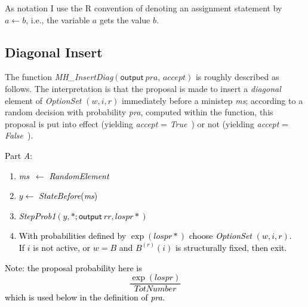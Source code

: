 \documentclass[a4paper,12pt,fleqn]{article}
\newcommand{\nnm}[1]{\textsf{\small\textit{#1}\ }}
\newcommand{\R}{{\sf R }}
\newcommand{\ms}{\textsl{\textsf{\small ms}}} %
\newcommand{\adda}[1]{{#1}}  %
\newcommand{\addaa}[1]{{\textcolor[named]{Black}{#1}}}  %
\begin{document}
As notation I use the \R convention of denoting an assignment statement by $a \leftarrow b$,
i.e., the variable $a$ gets the value $b$.

\subsection{Diagonal Insert}


The function
\textit{MH\_InsertDiag}$(%
\textsf{output}\ \textit{pra, accept})$
is roughly described as follows.
The interpretation is that
the proposal is made to insert a \textit{diagonal} element of \adda{\textit{OptionSet}}
$(w,i,r)$ immediately before a ministep \ms;
according to a random decision with probability \textit{pra},
computed within the function,
this proposal is put into effect (yielding \textit{accept} = \nnm{True})
or not (yielding \textit{accept} = \nnm{False}).

\newpage
\addaa{
Part \emph{A}:
\begin{enumerate}
\item \ms\ $ \leftarrow $ \textit{RandomElement}
\item $y \leftarrow $ \textit{StateBefore}(\ms)
\item \textit{StepProb1}$(y, *; \textsf{output}\ rr, lospr*)$
\item With probabilities defined by $\exp(lospr*)$ choose \textit{OptionSet} $(w,i,r)$.\\
      If $i$ is not active, or $w=B$ and $B^{(r)}(i)$ is structurally fixed, then exit.
\end{enumerate}
Note: the proposal probability here is
\[
\frac{ \exp(lospr)}{\textit{TotNumber}}
\]
which is used below in the definition of \textit{pra}.
}
\end{document}
